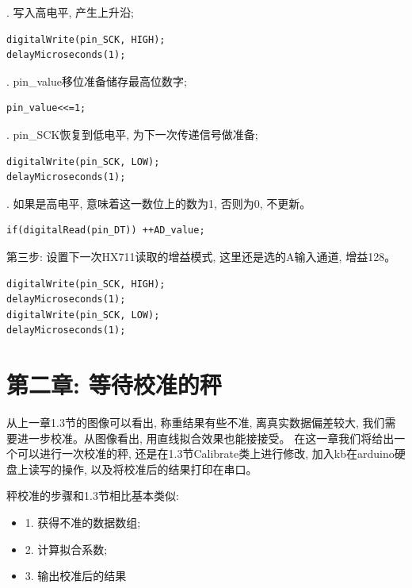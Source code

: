 \documentclass{article}
\begin{document}
\noindent \uppercase\expandafter{}. 写入高电平, 产生上升沿;

\begin{lstlisting}
digitalWrite(pin_SCK, HIGH); 
delayMicroseconds(1);
\end{lstlisting}

\noindent \uppercase\expandafter{}. pin\_value移位准备储存最高位数字;

\begin{lstlisting}
pin_value<<=1; 
\end{lstlisting}

\noindent \uppercase\expandafter{}. pin\_SCK恢复到低电平, 为下一次传递信号做准备;

\begin{lstlisting}
digitalWrite(pin_SCK, LOW); 
delayMicroseconds(1);
\end{lstlisting}

\noindent \uppercase\expandafter{}. 如果是高电平, 意味着这一数位上的数为1, 否则为0, 不更新。

\begin{lstlisting}
if(digitalRead(pin_DT)) ++AD_value; 
\end{lstlisting}

\noindent 第三步: 设置下一次HX711读取的增益模式, 这里还是选的A输入通道, 增益128。

\begin{lstlisting}
digitalWrite(pin_SCK, HIGH); 
delayMicroseconds(1);
digitalWrite(pin_SCK, LOW); 
delayMicroseconds(1);
\end{lstlisting}

\section{第二章: 等待校准的秤}
从上一章1.3节的图像可以看出, 称重结果有些不准, 离真实数据偏差较大, 我们需要进一步校准。从图像看出, 用直线拟合效果也能接接受。
在这一章我们将给出一个可以进行一次校准的秤, 还是在1.3节Calibrate类上进行修改, 加入kb在arduino硬盘上读写的操作, 以及将校准后的结果打印在串口。

秤校准的步骤和1.3节相比基本类似:
\begin{itemize}
  \item 1. 获得不准的数据数组;
  \item 2. 计算拟合系数;
  \item 3. 输出校准后的结果
\end{itemize}
\end{document}
